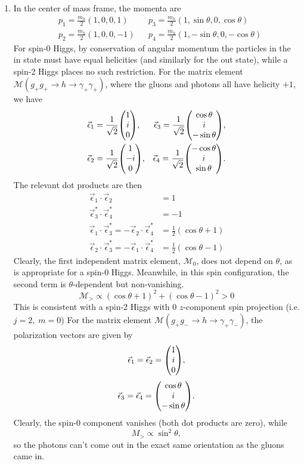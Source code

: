 \documentclass[12pt]{article}
\begin{document}
\begin{enumerate}[label=(\alph*)]
    \item In the center of mass frame, the momenta are
    \begin{align*}
        &p_1 = \frac{m_h}{2}(1, 0, 0, 1) && p_3 = \frac{m_h}{2}(1, \sin\theta, 0, \cos\theta) \\
        &p_2 = \frac{m_h}{2}(1, 0, 0, -1) && p_4 = \frac{m_h}{2}(1, -\sin\theta, 0, -\cos\theta)
    \end{align*}
    For spin-0 Higgs, by conservation of angular momentum the particles in the in state must have equal helicities (and similarly for the out state), while a spin-2 Higgs places no such restriction. For the matrix element $\mathcal{M}(g_+g_+ \to h \to \gamma_+\gamma_+)$, where the gluons and photons all have helicity $+1$, we have
    \begin{align*}
        &\vec{\epsilon}_1 = \frac{1}{\sqrt{2}}\mqty(1\\i\\0), & \vec{\epsilon}_3 = \frac{1}{\sqrt{2}}\mqty(\cos\theta\\i\\-\sin\theta), \\
        &\vec{\epsilon}_2 = \frac{1}{\sqrt{2}}\mqty(1\\-i\\0), & \vec{\epsilon}_4 = \frac{1}{\sqrt{2}}\mqty(-\cos\theta\\i\\\sin\theta).
    \end{align*}
    The relevant dot products are then
    \begin{align*}
        \vec{\epsilon}_1\cdot\vec{\epsilon}_2 &= 1 \\
        \vec{\epsilon}_3^*\cdot\vec{\epsilon}_4^* &= -1 \\
        \vec{\epsilon}_1\cdot\vec{\epsilon}_3^* = -\vec{\epsilon}_2\cdot\vec{\epsilon}_4^* &= \frac{1}{2}(\cos\theta + 1) \\
        \vec{\epsilon}_2\cdot\vec{\epsilon}_3^* = -\vec{\epsilon}_1\cdot\vec{\epsilon}_4^* &= \frac{1}{2}(\cos\theta - 1)
    \end{align*}
    Clearly, the first independent matrix element, $\mathcal{M}_0$, does not depend on $\theta$, as is appropriate for a spin-0 Higgs. Meanwhile, in this spin configuration, the second term is $\theta$-dependent but non-vanishing.
    \[ \mathcal{M}_> \propto \left(\cos\theta + 1\right)^2 + \left(\cos\theta - 1\right)^2 > 0 \]
    This is consistent with a spin-2 Higgs with 0 $z$-component spin projection (i.e. $j = 2,\; m = 0$)
    For the matrix element $\mathcal{M}(g_+g_- \to h \to \gamma_+\gamma_-)$, the polarization vectors are given by
    \[ \vec{\epsilon}_1 = \vec{\epsilon}_2 = \mqty(1\\i\\0), \]
    \[ \vec{\epsilon}_3 = \vec{\epsilon}_4 = \mqty(\cos\theta\\i\\-\sin\theta). \]
    Clearly, the spin-0 component vanishes (both dot products are zero), while 
    \[ M_> \propto \sin^2\theta, \]
    so the photons can't come out in the exact same orientation as the gluons came in.


\end{enumerate}
\end{document}
